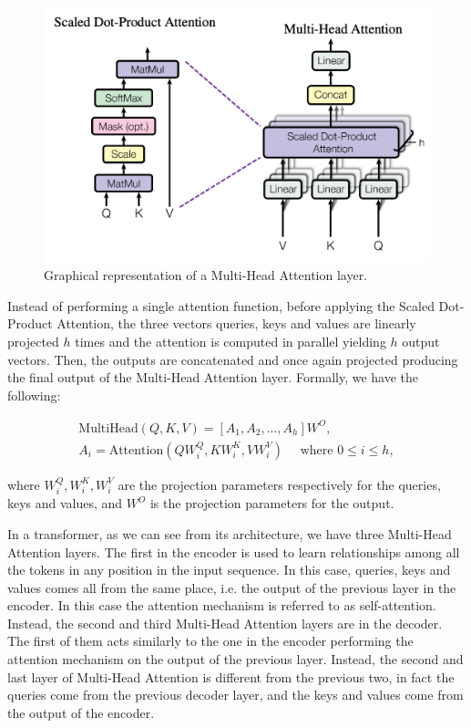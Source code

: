 \documentclass[binding=0.6cm,noexaminfo]{sapthesis}
\begin{document}
\begin{figure}[h!]
\centering
\includegraphics[width=.7\linewidth]{multi-head-attention}
\caption{Graphical representation of a Multi-Head Attention layer.}
\label{fig:mha}
\end{figure}

Instead of performing a single attention function, before applying the Scaled Dot-Product Attention, the three vectors queries, keys and values are linearly projected $h$ times and the attention is computed in parallel yielding $h$ output vectors. Then, the outputs are concatenated and once again projected producing the final output of the Multi-Head Attention layer. Formally, we have the following:

\begin{gather}
\text{MultiHead}(Q, K, V) = [A_1, A_2, \dots, A_h] W^O, \\
A_i = \text{Attention}(QW_i^Q, KW_i^K, VW_i^V) \quad \text{ where } 0 \le i \le h,
\end{gather}

where $W_i^Q, W_i^K, W_i^V$ are the projection parameters respectively for the queries, keys and values, and $W^O$ is the projection parameters for the output.

In a transformer, as we can see from its architecture, we have three Multi-Head Attention layers. The first in the encoder is used to learn relationships among all the tokens in any position in the input sequence. In this case, queries, keys and values comes all from the same place, i.e. the output of the previous layer in the encoder. In this case the attention mechanism is referred to as self-attention. Instead, the second and third Multi-Head Attention layers are in the decoder. The first of them acts similarly to the one in the encoder performing the attention mechanism on the output of the previous layer. Instead, the second and last layer of Multi-Head Attention is different from the previous two, in fact the queries come from the previous decoder layer, and the keys and values come from the output of the encoder.
\end{document}
